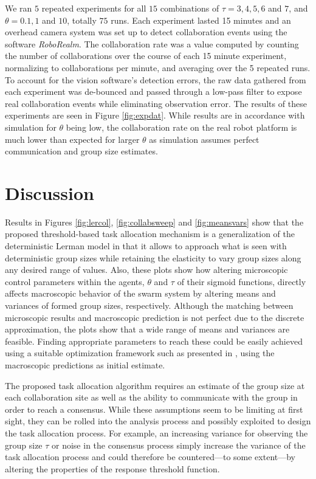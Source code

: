 \documentclass{svmult}  %
\begin{document}
We ran $5$ repeated experiments for all $15$ combinations of $\tau = 3,4,5,6$ and $7$, and $\theta = 0.1, 1$ and $10$, totally $75$ runs. Each experiment lasted 15 minutes and an overhead camera system was set up to detect collaboration events using the software \emph{RoboRealm}. The collaboration rate was a value computed by counting the number of collaborations over the course of each 15 minute experiment, normalizing to collaborations per minute, and averaging over the 5 repeated runs. 
To account for the vision software's detection errors, the raw data gathered from each experiment was de-bounced and passed through a low-pass filter to expose real collaboration events while eliminating observation error. The results of these experiments are seen in Figure \ref{fig:expdat}. While results are in accordance with simulation for $\theta$ being low, the collaboration rate on the real robot platform is much lower than expected for larger $\theta$ as simulation assumes perfect communication and group size estimates.


\section{Discussion}\label{sec:discussion}
Results in Figures \ref{fig:lercol}, \ref{fig:collabsweep} and \ref{fig:meansvars} show that the proposed threshold-based task allocation mechanism is a generalization of the deterministic Lerman model in that it allows to approach what is seen with deterministic group sizes while retaining the elasticity to vary group sizes along any desired range of values. Also, these plots show how altering microscopic control parameters within the agents, $\theta$ and $\tau$ of their sigmoid functions, directly affects macroscopic behavior of the swarm system by altering means and variances of formed group sizes, respectively. Although the matching between microscopic results and macroscopic prediction is not perfect due to the discrete approximation, the plots show that a wide range of means and variances are feasible. Finding appropriate parameters to reach these could be easily achieved using a suitable optimization framework such as presented in \cite{Correll2008,Berman2009}, using the macroscopic predictions as initial estimate. 

The proposed task allocation algorithm requires an estimate of the group size at each collaboration site as well as the ability to communicate with the group in order to reach a consensus. While these assumptions seem to be limiting at first sight, they can be rolled into the analysis process and possibly exploited to design the task allocation process. For example, an increasing variance for observing the group size $\tau$ or noise in the consensus process simply increase the variance of the task allocation process and could therefore be countered---to some extent---by altering the properties of the response threshold function. 
\end{document}
